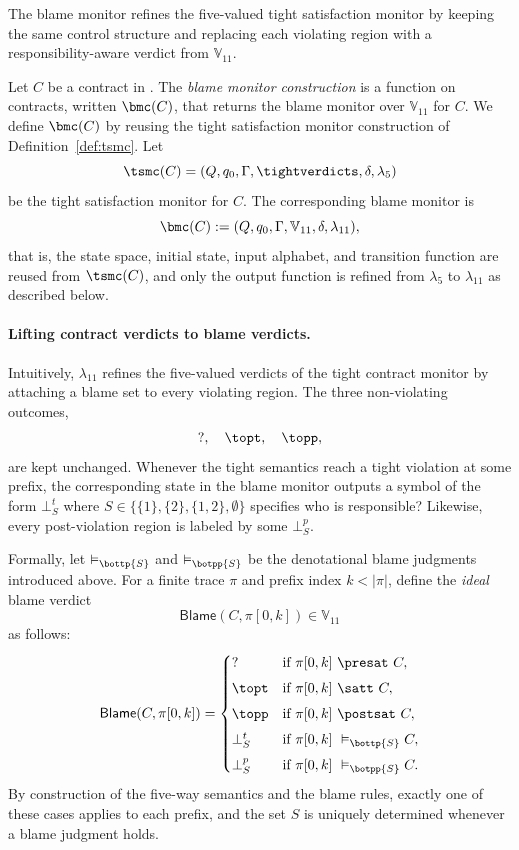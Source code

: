 The blame monitor refines the five-valued tight satisfaction monitor by keeping the same control structure and replacing each violating region with a
responsibility-aware verdict from $\mathbb{V}_{11}$.

\begin{definition}
\label{def:bmc}
Let $C$ be a contract in \cDL. The \emph{blame monitor construction} is a
function on contracts, written $\bmc(C)$, that returns the blame monitor over
$\mathbb{V}_{11}$ for $C$.
We define $\bmc(C)$ by reusing the tight satisfaction monitor construction of
Definition~\ref{def:tsmc}. Let
\[
\tsmc(C) = (Q,q_0,\Gamma,\tightverdicts,\delta,\lambda_5)
\]
be the tight satisfaction monitor for $C$.
The corresponding blame monitor is
\[
\bmc(C) := (Q,q_0,\Gamma,\mathbb{V}_{11},\delta,\lambda_{11}),
\]
that is, the state space, initial state, input alphabet, and transition
function are reused from $\tsmc(C)$, and only the output function is refined
from $\lambda_5$ to $\lambda_{11}$ as described below.
\end{definition}

\paragraph{Lifting contract verdicts to blame verdicts.}
Intuitively, $\lambda_{11}$ refines the five-valued verdicts of the tight
contract monitor by attaching a blame set to every violating region. The three
non-violating outcomes,
\[
\mathsf{?},\quad \topt,\quad \topp,
\]
are kept unchanged. Whenever the tight semantics reach a tight violation at
some prefix, the corresponding state in the blame monitor outputs a symbol of
the form $\bot^t_S$ where $S\in\{\{1\},\{2\},\{1,2\},\emptyset\}$ specifies who is responsible? Likewise, every post-violation region is labeled by some
$\bot^p_S$.

Formally, let $\vDash_{\bottp{S}}$ and $\vDash_{\botpp{S}}$ be the
denotational blame judgments introduced above. For a finite trace $\pi$ and
prefix index $k<|\pi|$, define the \emph{ideal} blame verdict
\[
\mathsf{Blame}(C,\pi[0,k]) \in \mathbb{V}_{11}
\]
as follows:
\[
\mathsf{Blame}(C,\pi[0,k]) =
\begin{cases}
\mathsf{?}
  & \text{if }\pi[0,k]\ \presat\ C,\\[4pt]
\topt
  & \text{if }\pi[0,k]\ \satt\ C,\\[4pt]
\topp
  & \text{if }\pi[0,k]\ \postsat\ C,\\[4pt]
\bot^t_S
  & \text{if }\pi[0,k]\ \vDash_{\bottp{S}} C,\\[4pt]
\bot^p_S
  & \text{if }\pi[0,k]\ \vDash_{\botpp{S}} C.
\end{cases}
\]
By construction of the five-way semantics and the blame rules, exactly one of these cases applies to each prefix, and the set $S$ is uniquely determined whenever a blame judgment holds.

